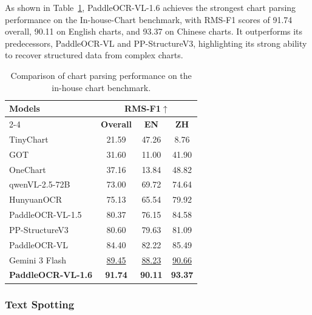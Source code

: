 \documentclass[11pt, a4paper,logo,  copyright, nonumbering]{paddleocr}
\begin{document}
As shown in Table~\ref{tab:chart_parsing}, PaddleOCR-VL-1.6 achieves the strongest chart parsing performance on the In-house-Chart benchmark, with RMS-F1\cite{liu2023deplotoneshotvisuallanguage} scores of 91.74 overall, 90.11 on English charts, and 93.37 on Chinese charts. It outperforms its predecessors, PaddleOCR-VL and PP-StructureV3, highlighting its strong ability to recover structured data from complex charts.

\begin{table}[H]
    \centering
    \scriptsize
    \setlength{\tabcolsep}{5pt}
    \renewcommand{\arraystretch}{0.9}
    \begin{tabular}{l|c c c}
        \toprule
        \multirow{2}{*}{\textbf{Models}} & \multicolumn{3}{c}{\textbf{RMS-F1$\uparrow$}} \\
        \cmidrule(lr){2-4}
        & \textbf{Overall} & \textbf{EN} & \textbf{ZH} \\
        \midrule
        TinyChart~\cite{zhang2024tinychart} & 21.59 & 47.26 & 8.76 \\
        GOT~\cite{GOT20} & 31.60 & 11.00 & 41.90 \\
        OneChart~\cite{OneChart} & 37.16 & 13.84 & 48.82 \\
        qwenVL-2.5-72B~\cite{Qwen25VL} & 73.00 & 69.72 & 74.64 \\
        HunyuanOCR~\cite{hunyuanvisionteam2025hunyuanocrtechnicalreport} & 75.13 & 65.54 & 79.92 \\
        PaddleOCR-VL-1.5~\cite{cui2026paddleocrvl15multitask09bvlm} & 80.37 & 76.15 & 84.58 \\
        PP-StructureV3~\cite{cui2025paddleocr} & 80.60 & 79.63 & 81.09 \\
        PaddleOCR-VL~\cite{cui2025paddleocrvl} & 84.40 & 82.22 & 85.49 \\
        Gemini 3 Flash~\cite{gemini30} & \cellcolor{cyan!15}\underline{89.45} & \cellcolor{cyan!15}\underline{88.23} & \cellcolor{cyan!15}\underline{90.66} \\
        \textbf{PaddleOCR-VL-1.6} & \cellcolor{red!15}\textbf{91.74} & \cellcolor{red!15}\textbf{90.11} & \cellcolor{red!15}\textbf{93.37} \\
        \bottomrule
    \end{tabular}
    \caption{Comparison of chart parsing performance on the in-house chart benchmark.}
    \label{tab:chart_parsing}
\end{table}

\subsubsection{Text Spotting}
\end{document}
